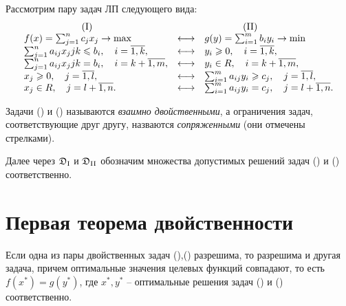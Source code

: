 Рассмотрим пару задач ЛП следующего вида:
\[
	\begin{array}{lcl}
		\qquad \qquad \qquad (\text{\RomanNumeralCaps{1}})                 &                     & \qquad \qquad (\text{\RomanNumeralCaps{2}})                      \\
		f(x) = \sum_{j=1}^{n}c_jx_j \rightarrow \max                       & \longleftrightarrow & g(y) = \sum_{i=1}^{m}b_iy_i \rightarrow \min                     \\
		\sum_{j=1}^{n}a_{ij}x_jjk \leqslant b_i, \quad i = \overline{1,k}, & \longleftrightarrow & y_i \geqslant 0, \quad i = \overline{1,k},                       \\
		\sum_{j=1}^{n}a_{ij}x_jjk = b_i, \quad i = k + \overline{1,m},     & \longleftrightarrow & y_i \in R, \quad i = k + \overline{1,m},                         \\
		x_j \geqslant 0, \quad j = \overline{1,l},                         & \longleftrightarrow & \sum_{i=1}^{m}a_{ij}y_i \geqslant c_j, \quad j = \overline{1,l}, \\
		x_j \in R, \quad j = l + \overline{1,n}.                           & \longleftrightarrow & \sum_{i=1}^{m}a_{ij}y_i = c_j, \quad j = l + \overline{1,n}.
	\end{array}
\]

\begin{definition}
	Задачи () и () называются \emph{взаимно двойственными}, а ограничения задач, соответствующие друг другу, назваются \emph{сопряженными} (они отмечены стрелками).

	Далее через $ \mathfrak{D}_\text{\RomanNumeralCaps{1}} $ и $ \mathfrak{D}_\text{\RomanNumeralCaps{2}} $ обозначим множества допустимых решений задач () и () соответственно.
\end{definition}

\section{Первая теорема двойственности}

\begin{theorem}
	Если одна из пары двойственных задач (),() разрешима, то разрешима и другая задача, причем оптимальные значения целевых функций совпадают, то есть $ f(x^{*}) = g(y^*) $, где $ x^*,y^* $ -- оптимальные решения задач () и () соответственно.
\end{theorem}

